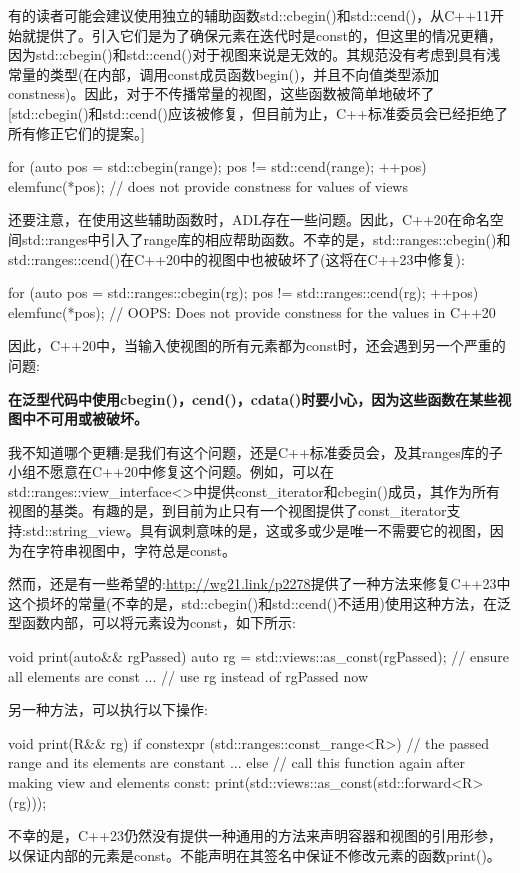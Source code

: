 有的读者可能会建议使用独立的辅助函数std::cbegin()和std::cend()，从C++11开始就提供了。引入它们是为了确保元素在迭代时是const的，但这里的情况更糟，因为std::cbegin()和std::cend()对于视图来说是无效的。其规范没有考虑到具有浅常量的类型(在内部，调用const成员函数begin()，并且不向值类型添加constness)。因此，对于不传播常量的视图，这些函数被简单地破坏了[std::cbegin()和std::cend()应该被修复，但目前为止，C++标准委员会已经拒绝了所有修正它们的提案。]

\begin{cpp}
for (auto pos = std::cbegin(range); pos != std::cend(range); ++pos) {
	elemfunc(*pos); // does not provide constness for values of views
}
\end{cpp}

还要注意，在使用这些辅助函数时，ADL存在一些问题。因此，C++20在命名空间std::ranges中引入了range库的相应帮助函数。不幸的是，std::ranges::cbegin()和std::ranges::cend()在C++20中的视图中也被破坏了(这将在C++23中修复):

\begin{cpp}
for (auto pos = std::ranges::cbegin(rg); pos != std::ranges::cend(rg); ++pos) {
	elemfunc(*pos); // OOPS: Does not provide constness for the values in C++20
}
\end{cpp}

因此，C++20中，当输入使视图的所有元素都为const时，还会遇到另一个严重的问题:

\textbf{在泛型代码中使用cbegin()，cend()，cdata()时要小心，因为这些函数在某些视图中不可用或被破坏。}

我不知道哪个更糟:是我们有这个问题，还是C++标准委员会，及其ranges库的子小组不愿意在C++20中修复这个问题。例如，可以在std::ranges::view\_interface<>中提供const\_iterator和cbegin()成员，其作为所有视图的基类。有趣的是，到目前为止只有一个视图提供了const\_iterator支持:std::string\_view。具有讽刺意味的是，这或多或少是唯一不需要它的视图，因为在字符串视图中，字符总是const。

然而，还是有一些希望的:\url{http://wg21.link/p2278}提供了一种方法来修复C++23中这个损坏的常量(不幸的是，std::cbegin()和std::cend()不适用)使用这种方法，在泛型函数内部，可以将元素设为const，如下所示:

\begin{cpp}
void print(auto&& rgPassed)
{
	auto rg = std::views::as_const(rgPassed); // ensure all elements are const
	... // use rg instead of rgPassed now
}
\end{cpp}

另一种方法，可以执行以下操作:

\begin{cpp}
void print(R&& rg)
{
	if constexpr (std::ranges::const_range<R>) {
		// the passed range and its elements are constant
		...
	}
	else {
		// call this function again after making view and elements const:
		print(std::views::as_const(std::forward<R>(rg)));
	}
}
\end{cpp}

不幸的是，C++23仍然没有提供一种通用的方法来声明容器和视图的引用形参，以保证内部的元素是const。不能声明在其签名中保证不修改元素的函数print()。


